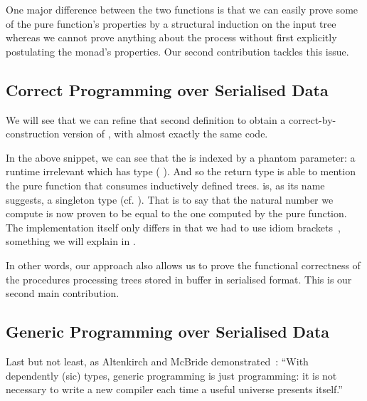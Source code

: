 One major difference between the two functions is that
we can easily prove some of the pure function's properties by a structural
induction on the input tree whereas we
cannot prove anything about the  process without first
explicitly postulating the  monad's properties.
%
Our second contribution tackles this issue.

\subsection{Correct Programming over Serialised Data}

We will see that we can refine that second definition to obtain
a correct-by-construction version of
, with almost exactly the same code.

\begin{center}
  \begin{minipage}{.7\textwidth}
  \end{minipage}
\end{center}

In the above snippet, we can see that the  is indexed
by a phantom parameter: a runtime irrelevant  which has type
( ).
%
And so the return type is able to mention the pure 
function that consumes inductively defined trees.
%
 is, as its name suggests, a singleton type
(cf. ). That is
to say that the natural number we compute is now proven to be equal to the
one computed by the pure  function.
%
The implementation itself only differs in that we had to use idiom
brackets~\cite{DBLP:journals/jfp/McbrideP08}, something we will explain
in .

In other words, our approach also allows us to prove the functional
correctness of the  procedures processing trees stored
in buffer in serialised format. This is our second main contribution.

\subsection{Generic Programming over Serialised Data}

Last but not least, as Altenkirch and McBride
demonstrated~\cite{DBLP:conf/ifip2-1/AltenkirchM02}:
``With dependently (sic) types, generic programming is just programming:
it is not necessary to write a new compiler each time a useful
universe presents itself.''

